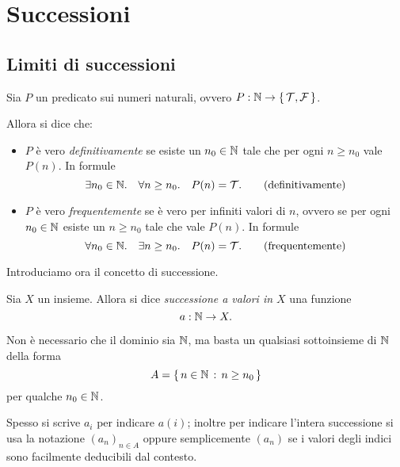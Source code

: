 \chapter{Successioni}

\section{Limiti di successioni}

\begin{definition}
    \label{def:definit_frequent}
    Sia $P$ un predicato sui numeri naturali, ovvero $P : \mathbb{N} \to \left\{\,\mathcal{T}, \mathcal{F}\,\right\}$.

    Allora si dice che:
    \begin{itemize}
        \item $P$ è vero \emph{definitivamente} se esiste un $n_0 \in \mathbb{N}$ tale che per ogni $n \geq n_0$ vale $P(n)$. In formule \begin{equation*}
            \exists n_0 \in \mathbb{N}. \quad \forall n \geq n_0. \quad P(n) = \mathcal{T}. \tag{definitivamente}
        \end{equation*}
        \item $P$ è vero \emph{frequentemente} se è vero per infiniti valori di $n$, ovvero se per ogni $n_0 \in \mathbb{N}$ esiste un $n \geq n_0$ tale che vale $P(n)$. In formule \begin{equation*}
            \forall n_0 \in \mathbb{N}. \quad \exists n \geq n_0. \quad P(n) = \mathcal{T}. \tag{frequentemente}
        \end{equation*}
    \end{itemize}
\end{definition}

Introduciamo ora il concetto di successione. 

\begin{definition}
    [Successione] \label{def:successione}
    Sia $X$ un insieme. Allora si dice \emph{successione a valori in $X$} una funzione \[
        a : \mathbb{N} \to X.    
    \]

    Non è necessario che il dominio sia $\mathbb{N}$, ma basta un qualsiasi sottoinsieme di $\mathbb{N}$ della forma \[
        A = \left\{\,n \in \mathbb{N} \,:\, n \geq n_0\,\right\}    
    \] per qualche $n_0 \in \mathbb{N}$. 

    Spesso si scrive $a_i$ per indicare $a(i)$; inoltre per indicare l'intera successione si usa la notazione $(a_n)_{n \in A}$ oppure semplicemente $(a_n)$ se i valori degli indici sono facilmente deducibili dal contesto.
\end{definition}

